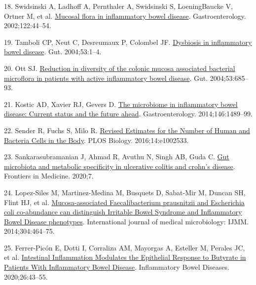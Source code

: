 \documentclass[
  12pt,
  a4paper,
  twoside,
  openright]{book}
\newlength{\cslhangindent}
\newlength{\cslentryspacingunit} %
\newenvironment{CSLReferences}[2] %
 {%
  \setlength{\parindent}{0pt}
  \ifodd #1
  \let\oldpar\par
  \def\par{\hangindent=\cslhangindent\oldpar}
  \fi
  \setlength{\parskip}{#2\cslentryspacingunit}
 }%
 {}
\begin{document}
\begin{CSLReferences}{0}{0}
\leavevmode{}%
18. Swidsinski A, Ladhoff A, Pernthaler A, Swidsinski S, LoeningBaucke V, Ortner M, et al. \href{https://doi.org/10.1053/gast.2002.30294}{Mucosal flora in inflammatory bowel disease}. Gastroenterology. 2002;122:44--54.

\leavevmode{}%
19. Tamboli CP, Neut C, Desreumaux P, Colombel JF. \href{https://doi.org/10.1136/gut.53.1.1}{Dysbiosis in inflammatory bowel disease}. Gut. 2004;53:1--4.

\leavevmode{}%
20. Ott SJ. \href{https://doi.org/10.1136/gut.2003.025403}{Reduction in diversity of the colonic mucosa associated bacterial microflora in patients with active inflammatory bowel disease}. Gut. 2004;53:685--93.

\leavevmode{}%
21. Kostic AD, Xavier RJ, Gevers D. \href{https://doi.org/10.1053/j.gastro.2014.02.009}{The microbiome in inflammatory bowel disease: Current status and the future ahead}. Gastroenterology. 2014;146:1489--99.

\leavevmode{}%
22. Sender R, Fuchs S, Milo R. \href{https://doi.org/10.1371/journal.pbio.1002533}{Revised Estimates for the Number of Human and Bacteria Cells in the Body}. PLOS Biology. 2016;14:e1002533.

\leavevmode{}%
23. Sankarasubramanian J, Ahmad R, Avuthu N, Singh AB, Guda C. \href{https://doi.org/10.3389/fmed.2020.606298}{Gut microbiota and metabolic specificity in ulcerative colitis and crohn's disease}. Frontiers in Medicine. 2020;7.

\leavevmode{}%
24. Lopez-Siles M, Martinez-Medina M, Busquets D, Sabat-Mir M, Duncan SH, Flint HJ, et al. \href{https://doi.org/10.1016/j.ijmm.2014.02.009}{Mucosa-associated Faecalibacterium prausnitzii and Escherichia coli co-abundance can distinguish Irritable Bowel Syndrome and Inflammatory Bowel Disease phenotypes}. International journal of medical microbiology: IJMM. 2014;304:464--75.

\leavevmode{}%
25. Ferrer-Picón E, Dotti I, Corraliza AM, Mayorgas A, Esteller M, Perales JC, et al. \href{https://doi.org/10.1093/ibd/izz119}{Intestinal Inflammation Modulates the Epithelial Response to Butyrate in Patients With Inflammatory Bowel Disease}. Inflammatory Bowel Diseases. 2020;26:43--55.


\end{CSLReferences}
\end{document}
